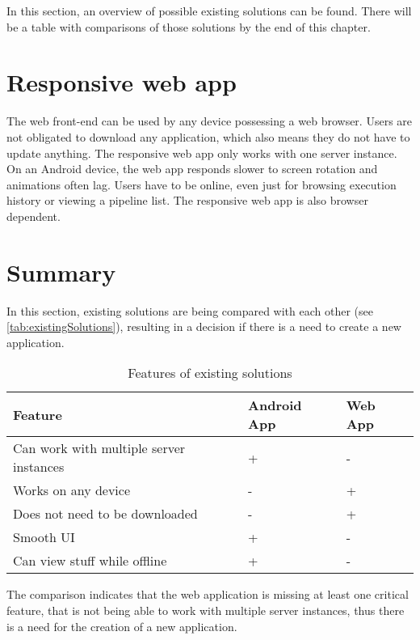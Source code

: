 In this section, an overview of possible existing solutions can be found. There will be a table with comparisons of those solutions by the end of this chapter.

\section{Responsive web app}
The web front-end can be used by any device possessing a web browser.
Users are not obligated to download any application, which also means they do not have to update anything.
The responsive web app only works with one server instance.
On an Android device, the web app responds slower to screen rotation and animations often lag.
Users have to be online, even just for browsing execution history or viewing a pipeline list.
The responsive web app is also browser dependent.

\section{Summary}
In this section, existing solutions are being compared with each other (see \autoref{tab:existingSolutions}), resulting in a decision if there is a need to create a new application.

\begin{table}[ht]\centering
\caption[Existing solutions]{Features of existing solutions}\label{tab:existingSolutions}
\begin{tabular}{l|l|l}
\hline
\textbf{Feature} & \textbf{Android App} & \textbf{Web App} \\ \hline
Can work with multiple server instances & + & - \\ \hline
Works on any device & - & + \\ \hline
Does not need to be downloaded & - & + \\ \hline
Smooth UI & + & - \\ \hline
Can view stuff while offline & + & - \\ \hline
\end{tabular}
\end{table}

The comparison indicates that the web application is missing at least one critical feature, that is not being able to work with multiple server instances, thus there is a need for the creation of a new application.